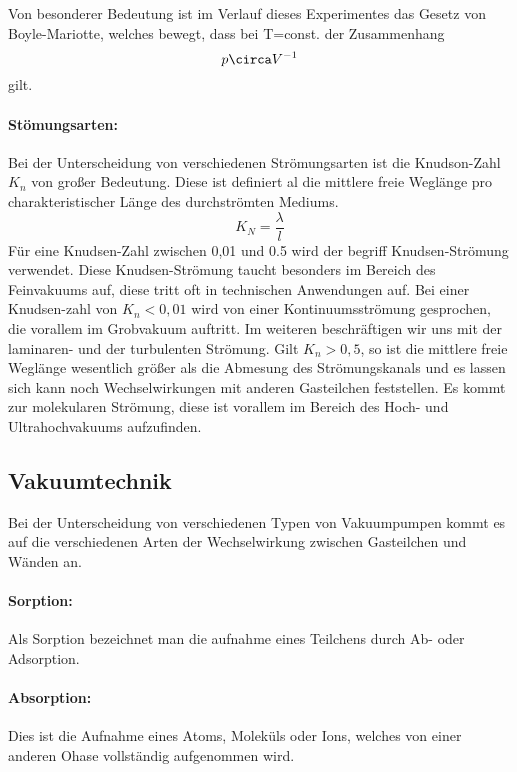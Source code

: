 Von besonderer Bedeutung ist im Verlauf dieses Experimentes das Gesetz von Boyle-Mariotte, welches bewegt,
dass bei T=const. der Zusammenhang
\begin{equation}
  p\circa V^{-1}
\end{equation}
gilt.

\paragraph{Stömungsarten:}
Bei der Unterscheidung von verschiedenen Strömungsarten ist die Knudson-Zahl $K_n$ von großer
Bedeutung. Diese ist definiert al die mittlere freie Weglänge pro charakteristischer Länge des
durchströmten Mediums.
\begin{equation}
  K_N = \frac{\lambda}{l}
\end{equation}
Für eine Knudsen-Zahl zwischen 0,01 und 0.5 wird der begriff Knudsen-Strömung verwendet. Diese
Knudsen-Strömung taucht besonders im Bereich des Feinvakuums auf, diese tritt oft in technischen Anwendungen
auf.
Bei einer Knudsen-zahl von $K_n < 0,01$ wird von einer Kontinuumsströmung gesprochen, die vorallem im
Grobvakuum auftritt. Im weiteren beschräftigen wir uns mit der laminaren- und der turbulenten Strömung.
Gilt $K_n > 0,5$, so ist die mittlere freie Weglänge wesentlich größer als die Abmesung des Strömungskanals
und es lassen sich kann noch Wechselwirkungen mit anderen Gasteilchen feststellen. Es kommt zur molekularen
Strömung, diese ist vorallem im Bereich des Hoch- und Ultrahochvakuums aufzufinden.

\subsection{Vakuumtechnik}
Bei der Unterscheidung von verschiedenen Typen von Vakuumpumpen kommt es auf die verschiedenen Arten der
Wechselwirkung zwischen Gasteilchen und Wänden an.
\paragraph{Sorption:}
Als Sorption bezeichnet man die aufnahme eines Teilchens durch Ab- oder Adsorption.

\paragraph{Absorption:}
Dies ist die Aufnahme eines Atoms, Moleküls oder Ions, welches von einer anderen Ohase vollständig
aufgenommen wird.

